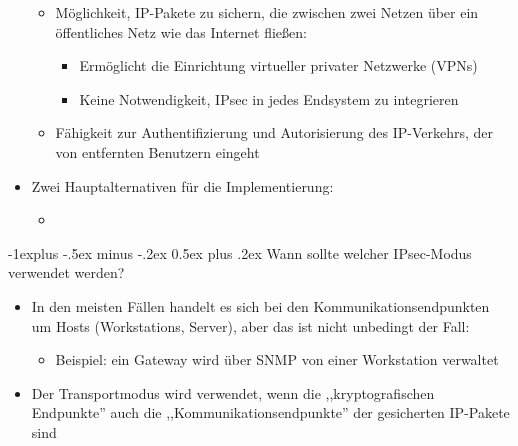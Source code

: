 \documentclass[a4paper]{article}
\makeatletter
\renewcommand{\subsection}{\@startsection{subsection}{2}{0mm}%
 {-1explus -.5ex minus -.2ex}%
 {0.5ex plus .2ex}%
 {\normalfont\normalsize\bfseries}}
\makeatother
\begin{document}
\begin{multicols}{3}
\begin{itemize}
              \begin{itemize}
                  \item
                        Möglichkeit, IP-Pakete zu sichern, die zwischen zwei Netzen über ein
                        öffentliches Netz wie das Internet fließen:

                        \begin{itemize}
                            \item
                                  Ermöglicht die Einrichtung virtueller privater Netzwerke (VPNs)
                            \item
                                  Keine Notwendigkeit, IPsec in jedes Endsystem zu integrieren
                        \end{itemize}
                  \item
                        Fähigkeit zur Authentifizierung und Autorisierung des IP-Verkehrs,
                        der von entfernten Benutzern eingeht
              \end{itemize}
        \item
              Zwei Hauptalternativen für die Implementierung:

              \begin{itemize}
                  \item
              \end{itemize}
    \end{itemize}


    \subsection{Wann sollte welcher IPsec-Modus verwendet
        werden?}

    \begin{itemize}
        \item
              In den meisten Fällen handelt es sich bei den Kommunikationsendpunkten
              um Hosts (Workstations, Server), aber das ist nicht unbedingt der
              Fall:

              \begin{itemize}
                  \item
                        Beispiel: ein Gateway wird über SNMP von einer Workstation verwaltet
              \end{itemize}
        \item
              Der Transportmodus wird verwendet, wenn die ,,kryptografischen
              Endpunkte'' auch die ,,Kommunikationsendpunkte'' der gesicherten
              IP-Pakete sind


\end{itemize}
\end{multicols}
\end{document}
